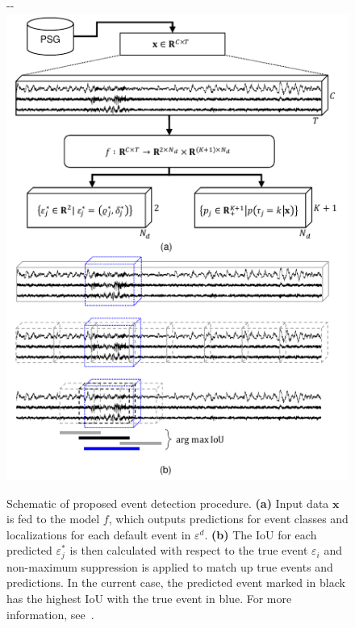 \begin{figure}
\begin{adjustwidth*}{}{-\marginparwidth-\marginparsep}
\centering
    \includegraphics[width=\linewidth]{figures/paper-iv/embc19-psg_event_detection-fig1-ppt.pdf}
    \caption[Event detection schematic]{Schematic of proposed event detection procedure. \textbf{(a)} Input data $\mathbf{x}$ is fed to the model $f$, which outputs predictions for event classes and localizations for each default event in $\varepsilon^{d}$. \textbf{(b)} The IoU for each predicted $\varepsilon^{*}_{j}$ is then calculated with respect to the true event $\varepsilon_{i}$ and non-maximum suppression is applied to match up true events and predictions. In the current case, the predicted event marked in black has the highest IoU with the true event in blue. For more information, see~\cite{Chambon2019,Chambon2018b,Liu2016}.}
    \label{fig:paperiv-schematic}
\end{adjustwidth*}
\end{figure}

